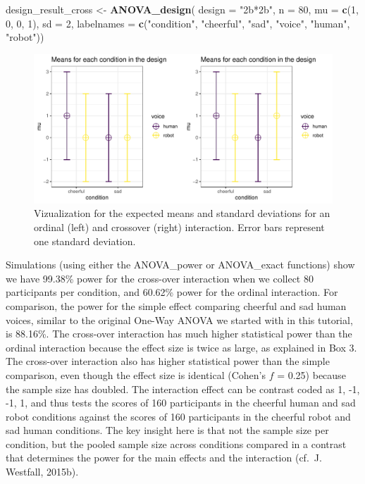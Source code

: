 \documentclass[
  ,jou,floatsintext]{apa6}
\newenvironment{Shaded}{\begin{snugshade}}{\end{snugshade}}
\newcommand{\DataTypeTok}[1]{\textcolor[rgb]{0.13,0.29,0.53}{#1}}
\newcommand{\DecValTok}[1]{\textcolor[rgb]{0.00,0.00,0.81}{#1}}
\newcommand{\KeywordTok}[1]{\textcolor[rgb]{0.13,0.29,0.53}{\textbf{#1}}}
\newcommand{\NormalTok}[1]{#1}
\newcommand{\StringTok}[1]{\textcolor[rgb]{0.31,0.60,0.02}{#1}}
\begin{document}
\begin{Shaded}
\begin{Highlighting}[]
\NormalTok{design_result_cross <-}\StringTok{ }\KeywordTok{ANOVA_design}\NormalTok{(}
 \DataTypeTok{design =} \StringTok{"2b*2b"}\NormalTok{, }\DataTypeTok{n =} \DecValTok{80}\NormalTok{, }
 \DataTypeTok{mu =} \KeywordTok{c}\NormalTok{(}\DecValTok{1}\NormalTok{, }\DecValTok{0}\NormalTok{, }\DecValTok{0}\NormalTok{, }\DecValTok{1}\NormalTok{), }\DataTypeTok{sd =} \DecValTok{2}\NormalTok{,}
 \DataTypeTok{labelnames =} \KeywordTok{c}\NormalTok{(}\StringTok{"condition"}\NormalTok{, }
                \StringTok{"cheerful"}\NormalTok{, }\StringTok{"sad"}\NormalTok{, }
                \StringTok{"voice"}\NormalTok{, }
                \StringTok{"human"}\NormalTok{, }\StringTok{"robot"}\NormalTok{))}
\end{Highlighting}
\end{Shaded}

\begin{figure}
\centering
\includegraphics{0.1_Simulation_Based_Power_Analysis_For_Factorial_ANOVA_Designs_files/figure-latex/mean-plot-1.pdf}
\caption{\label{fig:mean-plot}Vizualization for the expected means and standard deviations for an ordinal (left) and crossover (right) interaction. Error bars represent one standard deviation.}
\end{figure}

Simulations (using either the ANOVA\_power or ANOVA\_exact functions) show we have 99.38\% power for the cross-over interaction when we collect 80 participants per condition, and 60.62\% power for the ordinal interaction.
For comparison, the power for the simple effect comparing cheerful and sad human voices, similar to the original One-Way ANOVA we started with in this tutorial, is 88.16\%.
The cross-over interaction has much higher statistical power than the ordinal interaction because the effect size is twice as large, as explained in Box 3.
The cross-over interaction also has higher statistical power than the simple comparison, even though the effect size is identical (Cohen's \(f\) = 0.25) because the sample size has doubled.
The interaction effect can be contrast coded as 1, -1, -1, 1, and thus tests the scores of 160 participants in the cheerful human and sad robot conditions against the scores of 160 participants in the cheerful robot and sad human conditions.
The key insight here is that not the sample size per condition, but the pooled sample size across conditions compared in a contrast that determines the power for the main effects and the interaction (cf.~J. Westfall, 2015b).
\end{document}
